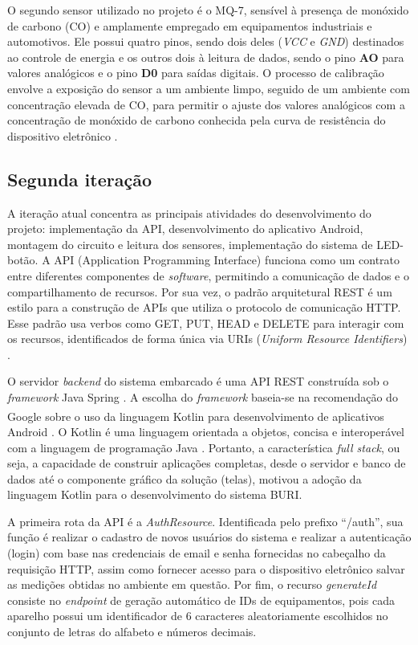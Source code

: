 O segundo sensor utilizado no projeto é o MQ-7, sensível à presença de monóxido de carbono (CO) e amplamente empregado em equipamentos industriais e automotivos. Ele possui quatro 
pinos, sendo dois deles (\textit{VCC} e \textit{GND}) destinados ao controle de energia e os outros dois à leitura de dados, sendo o pino \textbf{AO} para valores analógicos e o pino \textbf{D0} para saídas digitais. 
O processo de calibração envolve a exposição do sensor a um ambiente limpo, seguido de um ambiente com concentração elevada de CO, para permitir o ajuste dos valores analógicos com a concentração de monóxido 
de carbono conhecida pela curva de resistência do dispositivo eletrônico \cite{mq7-documentation}.

\subsection{Segunda iteração}\label{ExecAtv2It}

A iteração atual concentra as principais atividades do desenvolvimento do projeto: implementação da API, 
desenvolvimento do aplicativo Android, montagem do circuito e leitura dos sensores, implementação do sistema de LED-botão. A API (Application Programming Interface) funciona como um contrato 
entre diferentes componentes de \textit{software}, permitindo a comunicação de dados e o compartilhamento de recursos. Por sua vez, o padrão 
arquitetural REST é um estilo para a construção de APIs que utiliza o protocolo de comunicação HTTP. Esse padrão usa verbos como 
GET, PUT, HEAD e DELETE para interagir com os recursos, identificados de forma única via URIs (\textit{Uniform Resource Identifiers}) \cite{api-definition}.

O servidor \textit{backend} do sistema embarcado é uma API REST construída sob o \textit{framework} Java Spring \cite{spring-boot-documentation}. A escolha 
do \textit{framework} baseia-se na recomendação do Google\textsuperscript{\textregistered} sobre o uso da linguagem Kotlin para desenvolvimento de aplicativos Android \cite{android-developers}.
O Kotlin é uma linguagem orientada a objetos, concisa e interoperável com a linguagem de programação Java \cite{kotlin-documentation}. Portanto, a característica \textit{full stack}, ou seja, a 
capacidade de construir aplicações completas, desde o servidor e banco de dados até o componente gráfico da solução (telas), motivou a adoção da linguagem Kotlin para o desenvolvimento do sistema BURI.

A primeira rota da API é a \textit{AuthResource}. Identificada pelo prefixo ``/auth'', sua função é realizar o cadastro de novos usuários 
do sistema e realizar a autenticação (login) com base nas credenciais de email e senha fornecidas no cabeçalho da requisição HTTP, assim como 
fornecer acesso para o dispositivo eletrônico salvar as medições obtidas no ambiente em questão. Por fim, o recurso \textit{generateId} consiste no \textit{endpoint} de geração 
automático de IDs de equipamentos, pois cada aparelho possui um identificador de 6 caracteres aleatoriamente escolhidos no conjunto de letras do alfabeto e números decimais. 

